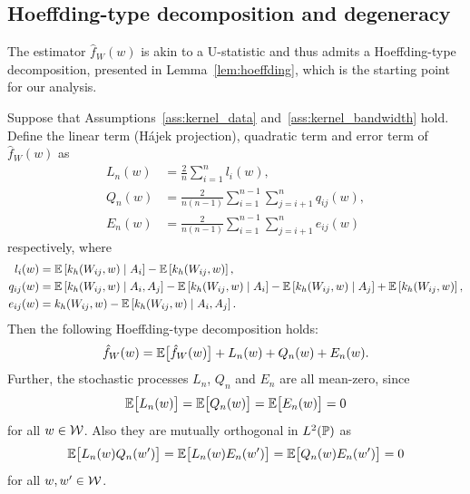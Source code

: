 \subsection{Hoeffding-type decomposition and degeneracy}
\label{sec:degeneracy}

The estimator $\hat{f}_W(w)$ is akin to a
U-statistic and thus admits a Hoeffding-type decomposition,
presented in Lemma~\ref{lem:hoeffding},
which is the starting point for our analysis.

\begin{lemma}
  \label{lem:hoeffding}

  Suppose that Assumptions~\ref{ass:kernel_data}
  and~\ref{ass:kernel_bandwidth}
  hold.
  Define the linear term
  (H\'{a}jek projection),
  quadratic term
  and error term
  of $\hat f_W(w)$ as
  \begin{align*}
    L_n(w)
    &=
    \frac{2}{n} \sum_{i=1}^n
    l_i(w), \\
    Q_n(w)
    &=
    \frac{2}{n(n-1)}
    \sum_{i=1}^{n-1}
    \sum_{j=i+1}^{n}
    q_{i j}(w), \\
    E_n(w)
    &=
    \frac{2}{n(n-1)}
    \sum_{i=1}^{n-1}
    \sum_{j=i+1}^{n}
    e_{i j}(w)
  \end{align*}
  respectively, where
  \begin{align*}
    l_i(w)
    &=
    \E\left[k_h(W_{i j},w) \mid A_i\right] - \E\left[k_h(W_{i j},w)\right], \\
    q_{i j}(w)
    &=
    \E\left[k_h(W_{i j},w) \mid A_i, A_j\right]
    - \E\left[k_h(W_{i j},w) \mid A_i\right]
    - \E\left[k_h(W_{i j},w) \mid A_j\right]
    + \E\left[k_h(W_{i j},w)\right], \\
    e_{i j}(w)
    &=
    k_h(W_{i j},w)
    - \E\left[k_h(W_{i j},w) \mid A_i, A_j\right].
  \end{align*}
  Then the following Hoeffding-type decomposition holds:
  \begin{align}
    \label{eq:h-decomposition}
    \hat f_W(w)
    = \E\big[\hat f_W(w)\big]
    + L_n(w)
    + Q_n(w)
    + E_n(w).
  \end{align}
  Further,
  the stochastic processes
  $L_n$, $Q_n$ and $E_n$
  are all mean-zero, since
  \begin{equation*}
    \E\big[L_n(w)\big]
    = \E\big[Q_n(w)\big]
    = \E\big[E_n(w)\big]
    = 0
  \end{equation*}
  for all $w \in \cW$.
  Also they are mutually orthogonal
  in $L^2(\P)$ as
  \begin{equation*}
    \E\big[
      L_n(w) Q_n(w')
    \big]
    = \E\big[
      L_n(w) E_n(w')
    \big]
    = \E\big[
      Q_n(w) E_n(w')
    \big]
    = 0
  \end{equation*}
  for all $w, w' \in \cW$.

\end{lemma}


